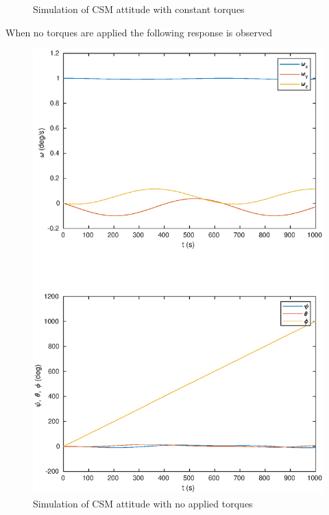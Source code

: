 \documentclass[a4paper]{article}
\begin{document}
\begin{enumerate}[a.]
\begin{figure}[H]
\begin{center}
    \end{center}
    \caption{Simulation of CSM attitude with constant torques}
    \label{fig:task_c_torques}
    \end{figure}

    When no torques are applied the following response is observed
    \begin{figure}[H]
    \begin{center}
      \includegraphics[scale=0.7]{task_c_no_torques.eps}
    \end{center}
    \caption{Simulation of CSM attitude with no applied torques}
    \label{fig:task_c_no_torques}
    \end{figure}
\end{enumerate}
\end{document}
